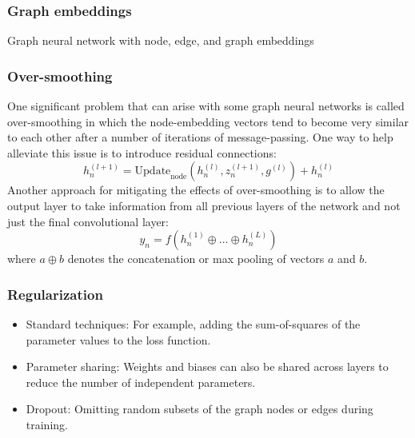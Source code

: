 \documentclass{beamer}
\begin{document}
\begin{frame}
    \frametitle{Graph embeddings}
    \begin{algorithm}[H]
        \caption{Graph neural network with node, edge, and graph embeddings}
        \;
    \end{algorithm}
\end{frame}

\begin{frame}
    \frametitle{Over-smoothing}
    One significant problem that can arise with some graph neural networks is called over-smoothing in which the node-embedding vectors tend to become very similar to each other after a number of iterations of message-passing. One way to help alleviate this issue is to introduce residual connections:
    \begin{equation*}
        h^{(l+1)}_{n}=\mathrm{Update}_{\textrm{node}}(h^{(l)}_{n},z^{(l+1)}_{n},g^{(l)})+h^{(l)}_{n}
    \end{equation*}
    Another approach for mitigating the effects of over-smoothing is to allow the output layer to take information from all previous layers of the network and not just the final convolutional layer:
    \begin{equation*}
        y_{n}=f(h^{(1)}_{n}\oplus\hdots\oplus{}h^{(L)}_{n})
    \end{equation*}
    where $a\oplus{}b$ denotes the concatenation or max pooling of vectors $a$ and $b$.
\end{frame}

\begin{frame}
    \frametitle{Regularization}
    \begin{itemize}
        \item Standard techniques: For example, adding the sum-of-squares of the parameter values to the loss function.
        \item Parameter sharing: Weights and biases can also be shared across layers to reduce the number of independent parameters.
        \item Dropout: Omitting random subsets of the graph nodes or edges during training.
    \end{itemize}
\end{frame}
\end{document}
